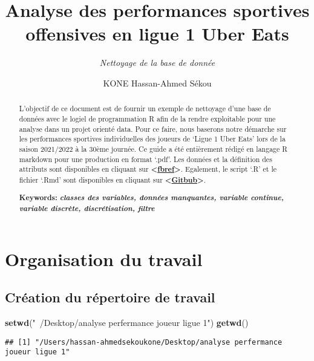 \documentclass[7pt,]{report}
\title{\textbf{Analyse des performances sportives offensives en ligue 1 Uber Eats}}
\subtitle{\emph{Nettoyage de la base de donnée}}
\author{KONE Hassan-Ahmed Sékou}
\date{}
\newenvironment{Shaded}{\begin{snugshade}}{\end{snugshade}}
\newcommand{\KeywordTok}[1]{\textcolor[rgb]{0.13,0.29,0.53}{\textbf{#1}}}
\newcommand{\NormalTok}[1]{#1}
\newcommand{\StringTok}[1]{\textcolor[rgb]{0.31,0.60,0.02}{#1}}
\begin{document}
\maketitle
\begin{abstract}
L'objectif de ce document est de fournir un exemple de nettoyage d'une base de données avec le logiel de programmation R afin de la rendre exploitable pour une analyse dans un projet orienté data. Pour ce faire, nous baserons notre démarche sur les performances sportives individuelles des joueurs de `Ligue 1 Uber Eats' lors de la saison 2021/2022 à la 30ème journée. Ce guide a été entièrement rédigé en langage R markdown pour une production en format `.pdf'. Les données et la définition des attributs sont disponibles en cliquant sur \textbf{\textless{}\href{https://fbref.com/fr/?lang=fr}{fbref}\textgreater{}}. Egalement, le script `.R' et le fichier `.Rmd' sont disponibles en cliquant sur \textbf{\textless{}\href{https://github.com/konehassan92/performances_offensives_L1_nettoyage_bdd}{Gitbub}\textgreater{}}.

\par

\textbf{Keywords:} \textbf{\emph{classes des variables, données manquantes, variable continue, variable discrète, discrétisation, filtre}}~
\end{abstract}

{
\setcounter{tocdepth}{4}
\tableofcontents
}
\hypertarget{organisation-du-travail}{%
\chapter{Organisation du travail}\label{organisation-du-travail}}

\hypertarget{cruxe9ation-du-ruxe9pertoire-de-travail}{%
\section{Création du répertoire de travail}\label{cruxe9ation-du-ruxe9pertoire-de-travail}}

\begin{Shaded}
\begin{Highlighting}[]
\KeywordTok{setwd}\NormalTok{(}\StringTok{"~/Desktop/analyse perfermance joueur ligue 1"}\NormalTok{)}
\KeywordTok{getwd}\NormalTok{()}
\end{Highlighting}
\end{Shaded}

\begin{verbatim}
## [1] "/Users/hassan-ahmedsekoukone/Desktop/analyse perfermance joueur ligue 1"
\end{verbatim}
\end{document}
